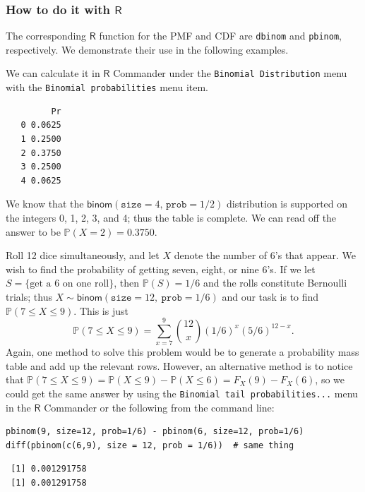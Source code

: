 \documentclass[captions=tableheading]{scrbook}
\begin{document}
\subsubsection{How to do it with \(\mathsf{R}\)}
\label{sec-5-3-1-1}


The corresponding \(\mathsf{R}\) function for the PMF and CDF are \texttt{dbinom} and \texttt{pbinom}, respectively. We demonstrate their use in the following examples.  

\begin{example}
We can calculate it in \(\mathsf{R}\) Commander under the \texttt{Binomial Distribution} menu with the \texttt{Binomial probabilities} menu item.


\begin{verbatim}
         Pr
   0 0.0625
   1 0.2500
   2 0.3750
   3 0.2500
   4 0.0625
\end{verbatim}

\end{example}

We know that the \(\mathsf{binom}(\mathtt{size}=4,\,\mathtt{prob}=1/2)\) distribution is supported on the integers 0, 1, 2, 3, and 4; thus the table is complete. We can read off the answer to be \(\mathbb{P}(X=2)=0.3750\).

\begin{example}
Roll 12 dice simultaneously, and let \(X\) denote the number of 6's that appear. We wish to find the probability of getting seven, eight, or nine 6's. If we let \(S=\{ \mbox{get a 6 on one roll} \} \), then \(\mathbb{P}(S)=1/6\) and the rolls constitute Bernoulli trials; thus \(X\sim\mathsf{binom}(\mathtt{size}=12,\ \mathtt{prob}=1/6)\) and our task is to find \(\mathbb{P}(7\leq X\leq9)\). This is just
\[ 
\mathbb{P}(7\leq X\leq9)=\sum_{x=7}^{9}{12 \choose x}(1/6)^{x}(5/6)^{12-x}.
\]
Again, one method to solve this problem would be to generate a probability mass table and add up the relevant rows. However, an alternative method is to notice that \(\mathbb{P}(7\leq X\leq9)=\mathbb{P}(X\leq9)-\mathbb{P}(X\leq6)=F_{X}(9)-F_{X}(6)\), so we could get the same answer by using the \texttt{Binomial tail probabilities...} menu in the \(\mathsf{R}\) Commander or the following from the command line: 


\lstset{language=R}
\begin{lstlisting}
pbinom(9, size=12, prob=1/6) - pbinom(6, size=12, prob=1/6)
diff(pbinom(c(6,9), size = 12, prob = 1/6))  # same thing
\end{lstlisting}

\begin{verbatim}
 [1] 0.001291758
 [1] 0.001291758
\end{verbatim}

\end{example}
\end{document}
